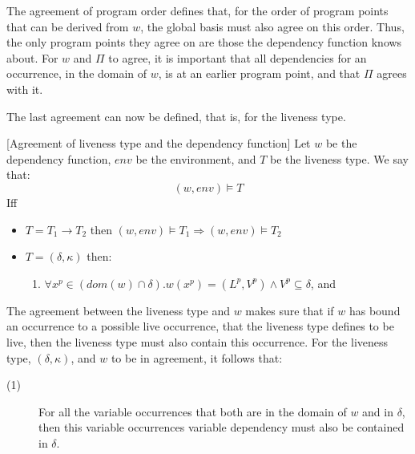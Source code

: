 \documentclass[../../master.tex]{subfiles}
\begin{document}
The agreement of program order defines that, for the order of program points that can be derived from $w$, the global basis must also agree on this order.
Thus, the only program points they agree on are those the dependency function knows about.
For $w$ and $\Pi$ to agree, it is important that all dependencies for an occurrence, in the domain of $w$, is at an earlier program point, and that $\Pi$ agrees with it.
\bigskip

The last agreement can now be defined, that is, for the liveness type.
\begin{definition}{[Agreement of liveness type and the dependency function]}
	Let $w$ be the dependency function, $env$ be the environment, and $T$ be the liveness type.
	We say that:
	$$(w,env)\models T$$
	Iff
	\begin{itemize}
		\item $T=T_1\rightarrow T_2$ then $(w,env)\models T_1 \Rightarrow (w,env)\models T_2$
		\item $T=(\delta,\kappa)$ then:
		\begin{enumerate}
			\item $\forall x^p\in (dom(w)\cap\delta). w(x^p)=(L^p,V^p)\wedge V^p\subseteq\delta$, and
		\end{enumerate}
	\end{itemize}
\end{definition}

The agreement between the liveness type and $w$ makes sure that if $w$ has bound an occurrence to a possible live occurrence, that the liveness type defines to be live, then the liveness type must also contain this occurrence.
For the liveness type, $(\delta,\kappa)$, and $w$ to be in agreement, it follows that:
\begin{description}
	\item[(1)] For all the variable occurrences that both are in the domain of $w$ and in $\delta$, then this variable occurrences variable dependency must also be contained in $\delta$.
\end{description}
\end{document}
